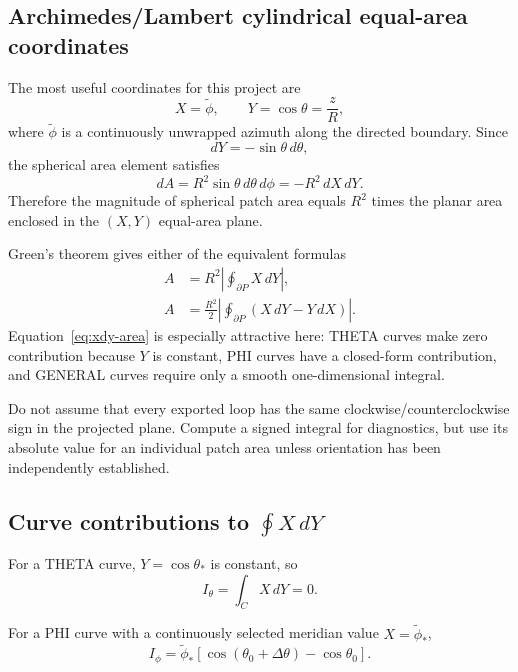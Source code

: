 \documentclass[11pt]{article}
\begin{document}
\subsection{Archimedes/Lambert cylindrical equal-area coordinates}

The most useful coordinates for this project are
\begin{equation}
  X=\widetilde{\phi},\qquad Y=\cos\theta=\frac{z}{R},
  \label{eq:equal-area-map}
\end{equation}
where $\widetilde{\phi}$ is a continuously unwrapped azimuth along the directed
boundary.  Since
\[
  dY=-\sin\theta\,d\theta,
\]
the spherical area element satisfies
\[
  dA=R^2\sin\theta\,d\theta\,d\phi
     =-R^2\,dX\,dY.
\]
Therefore the magnitude of spherical patch area equals $R^2$ times the planar
area enclosed in the $(X,Y)$ equal-area plane.

Green's theorem gives either of the equivalent formulas
\begin{align}
  A &= R^2\left|\oint_{\partial P} X\,dY\right|,
  \label{eq:xdy-area}\\
  A &= \frac{R^2}{2}\left|\oint_{\partial P}
          \left(X\,dY-Y\,dX\right)\right|.
  \label{eq:symmetric-area}
\end{align}
Equation~\eqref{eq:xdy-area} is especially attractive here: THETA curves make
zero contribution because $Y$ is constant, PHI curves have a closed-form
contribution, and GENERAL curves require only a smooth one-dimensional
integral.

Do not assume that every exported loop has the same clockwise/counterclockwise
sign in the projected plane.  Compute a signed integral for diagnostics, but
use its absolute value for an individual patch area unless orientation has been
independently established.

\subsection{Curve contributions to $\oint X\,dY$}

For a THETA curve, $Y=\cos\theta_*$ is constant, so
\[
  I_\theta=\int_C X\,dY=0.
\]

For a PHI curve with a continuously selected meridian value
$X=\widetilde{\phi}_*$,
\begin{equation}
  I_\phi=\widetilde{\phi}_*
  \left[\cos(\theta_0+\Delta\theta)-\cos\theta_0\right].
  \label{eq:phi-contribution}
\end{equation}
\end{document}
